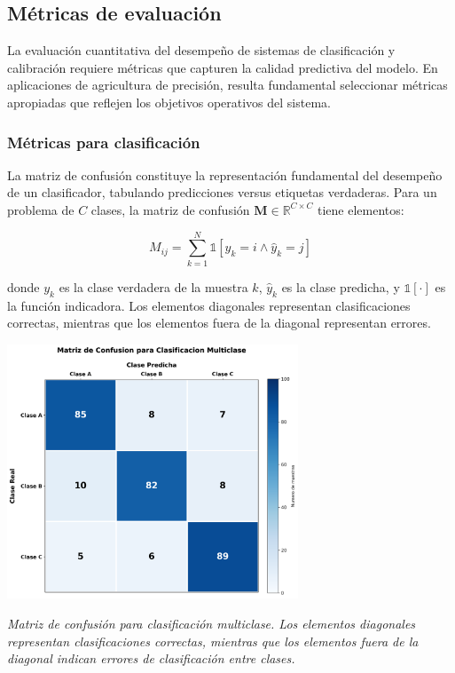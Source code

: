 \subsection{Métricas de evaluación}

La evaluación cuantitativa del desempeño de sistemas de clasificación y calibración requiere métricas que capturen la calidad predictiva del modelo. En aplicaciones de agricultura de precisión, resulta fundamental seleccionar métricas apropiadas que reflejen los objetivos operativos del sistema.

\subsubsection{Métricas para clasificación}

La matriz de confusión constituye la representación fundamental del desempeño de un clasificador, tabulando predicciones versus etiquetas verdaderas. Para un problema de $C$ clases, la matriz de confusión $\mathbf{M} \in \mathbb{R}^{C \times C}$ tiene elementos:

\begin{equation}
M_{ij} = \sum_{k=1}^{N} \mathbb{1}[y_k = i \land \hat{y}_k = j]
\end{equation}

donde $y_k$ es la clase verdadera de la muestra $k$, $\hat{y}_k$ es la clase predicha, y $\mathbb{1}[\cdot]$ es la función indicadora. Los elementos diagonales representan clasificaciones correctas, mientras que los elementos fuera de la diagonal representan errores.

\begin{table}[h]
\centering
\includegraphics[width=0.65\textwidth]{imagenes/matriz_confusion_ejemplo.png}
\caption{\textit{Matriz de confusión para clasificación multiclase. Los elementos diagonales representan clasificaciones correctas, mientras que los elementos fuera de la diagonal indican errores de clasificación entre clases.}}
\label{fig:matriz_confusion}
\end{table}

